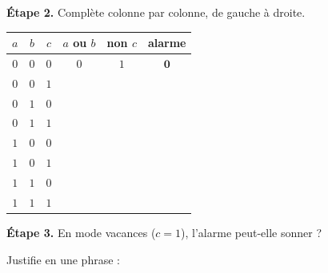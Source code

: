 \bigskip

\textbf{Étape 2.} Complète colonne par colonne, de gauche à droite.

\bigskip

\begin{center}
\begin{tabular}{|c|c|c|c|c|c|}
\hline
$a$ & $b$ & $c$ & $a$ ou $b$ & non $c$ & \textbf{alarme} \\
\hline
$0$ & $0$ & $0$ & $0$ & $1$ & $\mathbf{0}$ \\
\hline
$0$ & $0$ & $1$ & \dotfill & \dotfill & \dotfill \\
\hline
$0$ & $1$ & $0$ & \dotfill & \dotfill & \dotfill \\
\hline
$0$ & $1$ & $1$ & \dotfill & \dotfill & \dotfill \\
\hline
$1$ & $0$ & $0$ & \dotfill & \dotfill & \dotfill \\
\hline
$1$ & $0$ & $1$ & \dotfill & \dotfill & \dotfill \\
\hline
$1$ & $1$ & $0$ & \dotfill & \dotfill & \dotfill \\
\hline
$1$ & $1$ & $1$ & \dotfill & \dotfill & \dotfill \\
\hline
\end{tabular}
\end{center}

\bigskip

\textbf{Étape 3.} En mode vacances ($c = 1$), l'alarme peut-elle sonner ?

\medskip
\begin{center}
 \qquad {}
\end{center}

\medskip
Justifie en une phrase : \dotfill
